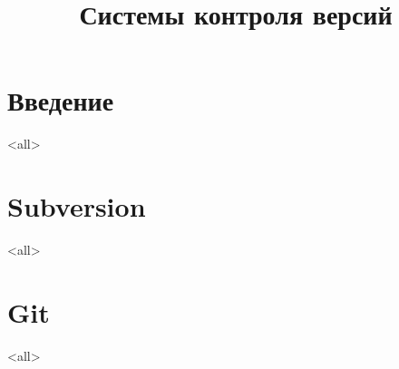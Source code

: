 

\title[VCS]{Системы контроля версий}





\begin{frame}
	\frametitle{}
	\titlepage
	\vspace{-0.5cm}
	\begin{center}
	\end{center}
\end{frame}

\begin{frame}
	\tableofcontents
\end{frame}




\section{Введение}
\mode<all>{}

\section[SVN]{Subversion}
\mode<all>{}

\section{Git}
\mode<all>{}


